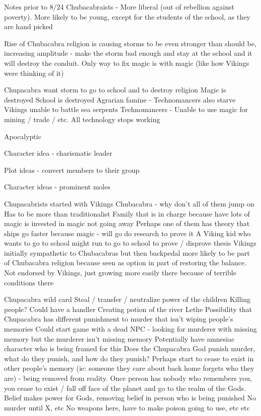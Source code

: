 \documentclass[blue]{GL2020}
\begin{document}
Notes prior to 8/24
Chubacabraists - More liberal (out of rebellion against poverty). More likely to be young, except for the students of the school, as they are hand picked

Rise of Chubacabra religion is causing storms to be even stronger than should be, increasing amplitude - make the storm bad enough and stay at the school and it will destroy the conduit.  Only way to fix magic is with magic (like how Vikings were thinking of it)

Chupacabra want storm to go to school and to destroy religion
Magic is destroyed
School is destroyed
Agrarian famine - Technomancers also starve
Vikings unable to battle sea serpents
Technomancers - Unable to use magic for mining / trade / etc.  All technology stops working

Apocalyptic

Character idea - charismatic leader

Plot ideas - convert members to their group

Character ideas - prominent moles

Chupacabrists started with Vikings
Chubacabra - why don’t all of them jump on
Has to be more than traditionalist
Family that is in charge because have lots of magic is invested in magic not going away
Perhaps one of them has theory that ships go faster because magic - will go do research to prove it
A Viking kid who wants to go to school might run to go to school to prove / disprove thesis
Vikings initially sympathetic to Chubacabras but then backpedal
more likely to be part of Chubacabra religion because seen as option in part of restoring the balance.  Not endorsed by Vikings, just growing more easily there because of terrible conditions there

Chupacabra wild card
Steal / transfer / neutralize power of the children
Killing people?  Could have a handler
Creating potion of the river Lethe
Possibility that Chupacabra has different punishment to murder that isn’t wiping people’s memories
Could start game with a dead NPC - looking for murderer with missing memory but the murderer isn’t missing memory
Potentially have amnesiac character who is being framed for this
Does the Chupacabra God punish murder, what do they punish, and how do they punish?
Perhaps start to cease to exist in other people’s memory (ie: someone they care about back home forgets who they are) - being removed from reality.  Once person has nobody who remembers you, you cease to exist / fall off face of the planet and go to the realm of the Gods.
Belief makes power for Gods, removing belief in person who is being punished
No murder until X, etc
No weapons here, have to make poison going to use, etc etc
\end{document}
